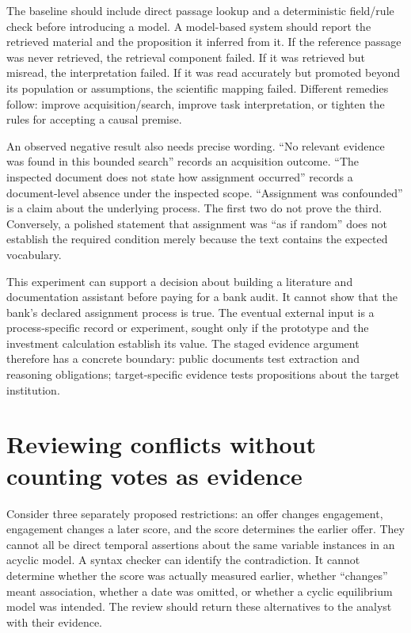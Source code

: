 The baseline should include direct passage lookup and a deterministic
field/rule check before introducing a model. A model-based system should
report the retrieved material and the proposition it inferred from it.
If the reference passage was never retrieved, the retrieval component
failed. If it was retrieved but misread, the interpretation failed. If
it was read accurately but promoted beyond its population or
assumptions, the scientific mapping failed. Different remedies follow:
improve acquisition/search, improve task interpretation, or tighten the
rules for accepting a causal premise.

An observed negative result also needs precise wording. ``No relevant
evidence was found in this bounded search'' records an acquisition
outcome. ``The inspected document does not state how assignment
occurred'' records a document-level absence under the inspected scope.
``Assignment was confounded'' is a claim about the underlying process.
The first two do not prove the third. Conversely, a polished statement
that assignment was ``as if random'' does not establish the required
condition merely because the text contains the expected vocabulary.

This experiment can support a decision about building a literature and
documentation assistant before paying for a bank audit. It cannot show
that the bank's declared assignment process is true. The eventual
external input is a process-specific record or experiment, sought only
if the prototype and the investment calculation establish its value. The
staged evidence argument therefore has a concrete boundary: public
documents test extraction and reasoning obligations; target-specific
evidence tests propositions about the target institution.

\hypertarget{reviewing-conflicts-without-counting-votes-as-evidence}{%
\section{Reviewing conflicts without counting votes as
evidence}\label{reviewing-conflicts-without-counting-votes-as-evidence}}

Consider three separately proposed restrictions: an offer changes
engagement, engagement changes a later score, and the score determines
the earlier offer. They cannot all be direct temporal assertions about
the same variable instances in an acyclic model. A syntax checker can
identify the contradiction. It cannot determine whether the score was
actually measured earlier, whether ``changes'' meant association,
whether a date was omitted, or whether a cyclic equilibrium model was
intended. The review should return these alternatives to the analyst
with their evidence.

